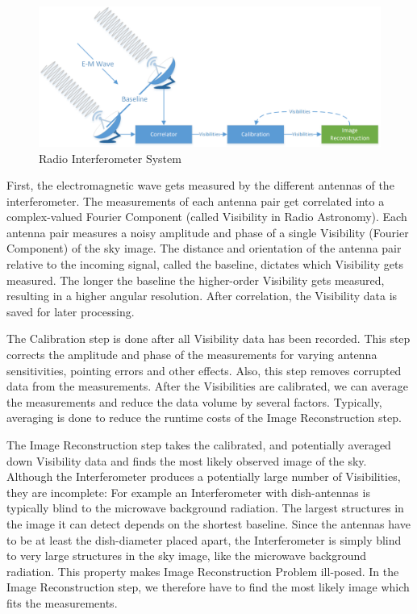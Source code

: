 \begin{figure}[h]
	\centering
	\includegraphics[width=0.80\linewidth]{./chapters/01.intro/system.png}
	\caption{Radio Interferometer System}
	\label{intro:system}
\end{figure}

First, the electromagnetic wave gets measured by the different antennas of the interferometer. The measurements of each antenna pair get correlated into a complex-valued Fourier Component (called Visibility in Radio Astronomy). Each antenna pair measures a noisy amplitude and phase of a single Visibility (Fourier Component) of the sky image. The distance and orientation of the antenna pair relative to the incoming signal, called the baseline, dictates which Visibility gets measured. The longer the baseline the higher-order Visibility gets measured, resulting in a higher angular resolution. After correlation, the Visibility data is saved for later processing.

The Calibration step is done after all Visibility data has been recorded. This step corrects the amplitude and phase of the measurements for varying antenna sensitivities, pointing errors and other effects. Also, this step removes corrupted data from the measurements. After the Visibilities are calibrated, we can average the measurements and reduce the data volume by several factors. Typically, averaging is done to reduce the runtime costs of the Image Reconstruction step.

The Image Reconstruction step takes the calibrated, and potentially averaged down Visibility data and finds the most likely observed image of the sky. Although the Interferometer produces a potentially large number of Visibilities, they are incomplete: For example an Interferometer with dish-antennas is typically blind to the microwave background radiation. The largest structures in the image it can detect depends on the shortest baseline. Since the antennas have to be at least the dish-diameter placed apart, the Interferometer is simply blind to very large structures in the sky image, like the microwave background radiation. This property makes Image Reconstruction Problem ill-posed. In the Image Reconstruction step, we therefore have to find the most likely image which fits the measurements.


